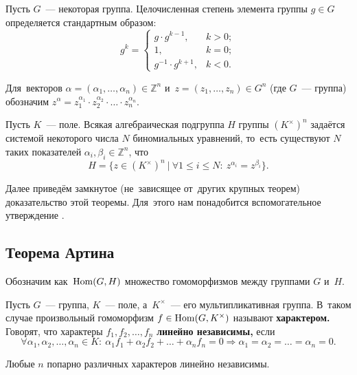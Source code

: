 \documentclass[a4paper,oneside]{article}
\newcommand{\notewrap}[1]{(#1)}
\begin{document}
Пусть $G$~— некоторая группа. Целочисленная степень элемента группы $g \in G$ определяется стандартным образом:
\[
  g^k =
  \begin{cases}
    g \cdot g^{k - 1}, & k > 0; \\
    1, & k = 0; \\
    g^{-1} \cdot g^{k + 1}, & k < 0.
  \end{cases}
\]

Для~векторов $\alpha = (\alpha_1, \ldots, \alpha_n) \in \mathbb{Z}^n$ и~$z = (z_1, \ldots, z_n) \in G^n$ (где $G$~— группа)
обозначим $z^\alpha = z_1^{\alpha_1} \cdot z_2^{\alpha_2} \cdot \ldots \cdot z_n^{\alpha_n}$.

\begin{theorem*}[\notewrap{Шмидт}]
  Пусть $K$~— поле. Всякая алгебраическая подгруппа $H$ группы $(K^{\times})^n$ задаётся
  системой некоторого числа $N$ биномиальных уравнений, то~есть существуют $N$ таких показателей $\alpha_i, \beta_i \in \mathbb{Z}^n$, что
  \[
    H = \{ z \in (K^{\times})^n\ |\ \forall 1 \leq i \leq N{:}\ z^{\alpha_i} = z^{\beta_i} \}.
  \]
\end{theorem*}

Далее приведём замкнутое (не~зависящее от~других крупных теорем) доказательство этой теоремы.
Для~этого нам понадобится вспомогательное утверждение \cite{Art48}.

\subsection{Теорема Артина}
Обозначим как~$\mathrm{Hom}(G, H)$ множество гомоморфизмов между группами $G$ и~$H$.

Пусть $G$~— группа, $K$~— поле, а~$K^{\times}$~— его мультипликативная группа.
В~таком случае произвольный гомоморфизм $f \in \mathrm{Hom}(G, K^{\times})$ называют \textbf{характером.}
Говорят, что характеры $f_1, f_2, \ldots, f_n$ \textbf{линейно независимы,}
если
\[
  \forall \alpha_1, \alpha_2, \ldots, \alpha_n \in K{:}\ \alpha_1 f_1 + \alpha_2 f_2 + \ldots + \alpha_n f_n = 0 \Rightarrow \alpha_1 = \alpha_2 = \ldots = \alpha_n = 0.
\]

\begin{theorem*}[\notewrap{Артин}]
  Любые $n$ попарно различных характеров линейно независимы.
\end{theorem*}
\end{document}
